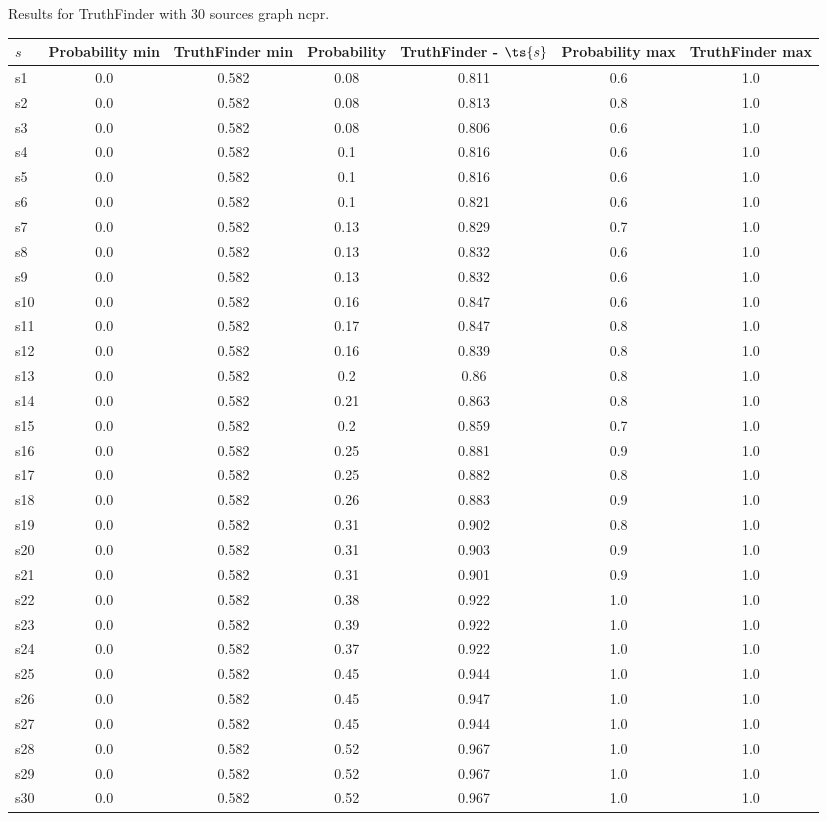 \documentclass{article}
\begin{document}
\noindent Results for TruthFinder with 30 sources graph ncpr.

\noindent\begin{tabular}{|l|c|c|c|c|c|c|}
\hline
$s$& Probability min & TruthFinder min & Probability & TruthFinder - $\ts{s}$ & Probability max & TruthFinder max\\
\hline
s1 &0.0 & 0.582 & 0.08 & 0.811 & 0.6 & 1.0\\
\hline
s2 &0.0 & 0.582 & 0.08 & 0.813 & 0.8 & 1.0\\
\hline
s3 &0.0 & 0.582 & 0.08 & 0.806 & 0.6 & 1.0\\
\hline
s4 &0.0 & 0.582 & 0.1 & 0.816 & 0.6 & 1.0\\
\hline
s5 &0.0 & 0.582 & 0.1 & 0.816 & 0.6 & 1.0\\
\hline
s6 &0.0 & 0.582 & 0.1 & 0.821 & 0.6 & 1.0\\
\hline
s7 &0.0 & 0.582 & 0.13 & 0.829 & 0.7 & 1.0\\
\hline
s8 &0.0 & 0.582 & 0.13 & 0.832 & 0.6 & 1.0\\
\hline
s9 &0.0 & 0.582 & 0.13 & 0.832 & 0.6 & 1.0\\
\hline
s10 &0.0 & 0.582 & 0.16 & 0.847 & 0.6 & 1.0\\
\hline
s11 &0.0 & 0.582 & 0.17 & 0.847 & 0.8 & 1.0\\
\hline
s12 &0.0 & 0.582 & 0.16 & 0.839 & 0.8 & 1.0\\
\hline
s13 &0.0 & 0.582 & 0.2 & 0.86 & 0.8 & 1.0\\
\hline
s14 &0.0 & 0.582 & 0.21 & 0.863 & 0.8 & 1.0\\
\hline
s15 &0.0 & 0.582 & 0.2 & 0.859 & 0.7 & 1.0\\
\hline
s16 &0.0 & 0.582 & 0.25 & 0.881 & 0.9 & 1.0\\
\hline
s17 &0.0 & 0.582 & 0.25 & 0.882 & 0.8 & 1.0\\
\hline
s18 &0.0 & 0.582 & 0.26 & 0.883 & 0.9 & 1.0\\
\hline
s19 &0.0 & 0.582 & 0.31 & 0.902 & 0.8 & 1.0\\
\hline
s20 &0.0 & 0.582 & 0.31 & 0.903 & 0.9 & 1.0\\
\hline
s21 &0.0 & 0.582 & 0.31 & 0.901 & 0.9 & 1.0\\
\hline
s22 &0.0 & 0.582 & 0.38 & 0.922 & 1.0 & 1.0\\
\hline
s23 &0.0 & 0.582 & 0.39 & 0.922 & 1.0 & 1.0\\
\hline
s24 &0.0 & 0.582 & 0.37 & 0.922 & 1.0 & 1.0\\
\hline
s25 &0.0 & 0.582 & 0.45 & 0.944 & 1.0 & 1.0\\
\hline
s26 &0.0 & 0.582 & 0.45 & 0.947 & 1.0 & 1.0\\
\hline
s27 &0.0 & 0.582 & 0.45 & 0.944 & 1.0 & 1.0\\
\hline
s28 &0.0 & 0.582 & 0.52 & 0.967 & 1.0 & 1.0\\
\hline
s29 &0.0 & 0.582 & 0.52 & 0.967 & 1.0 & 1.0\\
\hline
s30 &0.0 & 0.582 & 0.52 & 0.967 & 1.0 & 1.0\\
\hline
\end{tabular}\\
\end{document}
